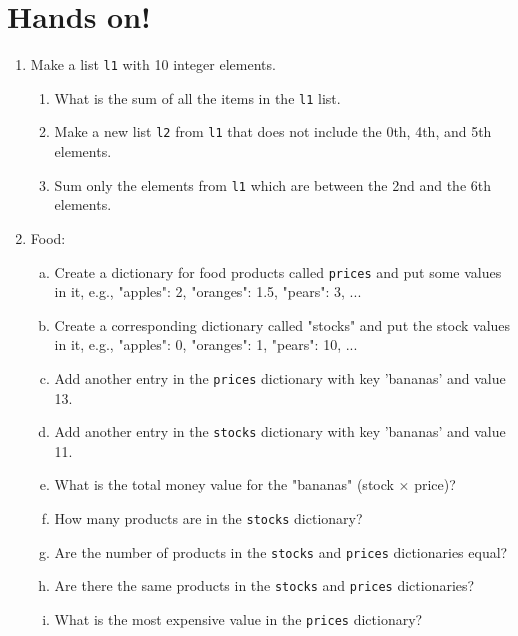 \documentclass[aspectratio=1610,slidestop]{beamer}
\begin{document}
\section{Hands on!}
\begin{pframe}
 \vspace{-0.5cm}
 \begin{enumerate}
  \item Make a list \texttt{l1} with 10 integer elements.
  \begin{enumerate}[a]
  \item What is the sum of all the items in the \texttt{l1} list.
  \item Make a new list \texttt{l2} from \texttt{l1} that does not include the 0th, 4th, and 5th elements.
  \item Sum only the elements from \texttt{l1} which are between the 2nd and the 6th elements.
  \end{enumerate}
  \item Food:
  \begin{enumerate}[a.]
   \item Create a dictionary for food products called \texttt{prices} and put some
   values in it, e.g., "apples": 2, "oranges": 1.5, "pears": 3, ...
   \item Create a corresponding dictionary called "stocks" and put the stock
   values in it, e.g., "apples": 0, "oranges": 1, "pears": 10, ...
   \item Add another entry in the \texttt{prices} dictionary with key 'bananas' and value 13.
   \item Add another entry in the \texttt{stocks} dictionary with key 'bananas' and value 11.
   \item What is the total money value for the "bananas" (stock $\times$ price)?
   \item How many products are in the \texttt{stocks} dictionary?\\
   \item Are the number of products in the \texttt{stocks} and \texttt{prices} dictionaries equal?
   \item Are there the same products in the \texttt{stocks} and \texttt{prices} dictionaries?
   \item What is the most expensive value in the \texttt{prices} dictionary?
  \end{enumerate}
 \end{enumerate}
\end{pframe}


\end{document}
